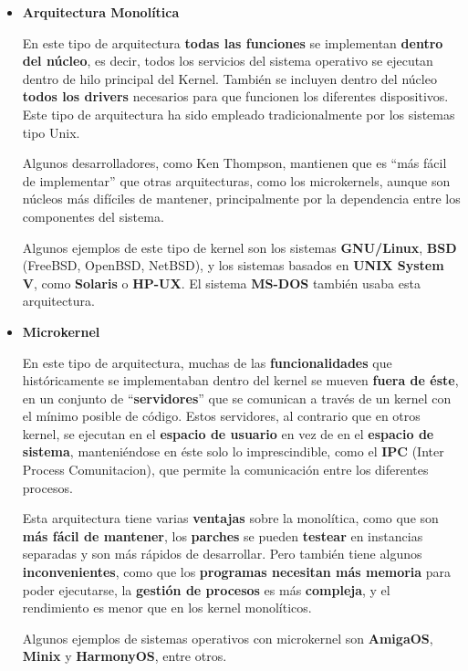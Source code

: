\begin{itemize}
    \item \textbf{Arquitectura Monolítica}

    En este tipo de arquitectura \textbf{todas las funciones} se implementan \textbf{dentro del núcleo}, es decir, todos los servicios del sistema operativo se ejecutan dentro de hilo principal del Kernel. También se incluyen dentro del núcleo \textbf{todos los drivers} necesarios para que funcionen los diferentes dispositivos. Este tipo de arquitectura ha sido empleado tradicionalmente por los sistemas tipo Unix. \cite{wiki04}

    Algunos desarrolladores, como Ken Thompson, mantienen que es ``más fácil de implementar'' que otras arquitecturas, como los microkernels, aunque son núcleos más difíciles de mantener, principalmente por la dependencia entre los componentes del sistema. \cite{wiki03}

    Algunos ejemplos de este tipo de kernel son los sistemas \textbf{GNU/Linux}, \textbf{BSD} (FreeBSD, OpenBSD, NetBSD), y los sistemas basados en \textbf{UNIX System V}, como \textbf{Solaris} o \textbf{HP-UX}. El sistema \textbf{MS-DOS} también usaba esta arquitectura.

    \item \textbf{Microkernel}

    En este tipo de arquitectura, muchas de las \textbf{funcionalidades} que históricamente se implementaban dentro del kernel se mueven \textbf{fuera de éste}, en un conjunto de ``\textbf{servidores}'' que se comunican a través de un kernel con el mínimo posible de código. Estos servidores, al contrario que en otros kernel, se ejecutan en el \textbf{espacio de usuario} en vez de en el \textbf{espacio de sistema}, manteniéndose en éste solo lo imprescindible, como el \textbf{IPC} (Inter Process Comunitacion), que permite la comunicación entre los diferentes procesos. \cite{wiki03}

    Esta arquitectura tiene varias \textbf{ventajas} sobre la monolítica, como que son \textbf{más fácil de mantener}, los \textbf{parches} se pueden \textbf{testear} en instancias separadas y son más rápidos de desarrollar. Pero también tiene algunos \textbf{inconvenientes}, como que los \textbf{programas necesitan más memoria} para poder ejecutarse, la \textbf{gestión de procesos} es más \textbf{compleja}, y el rendimiento es menor que en los kernel monolíticos. \cite{wiki03}

    Algunos ejemplos de sistemas operativos con microkernel son \textbf{AmigaOS}, \textbf{Minix} y 	\textbf{HarmonyOS}, entre otros.


\end{itemize}
